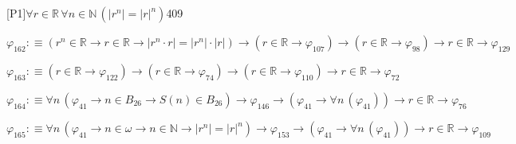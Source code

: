 \begin{fullproof}{[P1]}{$\forall r \in \mathbb{R}\,\forall n \in \mathbb{N}\,(\lvert {{r}^{n}} \rvert = {{\lvert r \rvert}^{n}})$}{409}
\begin{abbrevlist}
\item $\varphi_{162} :\equiv ({{r}^{n}} \in \mathbb{R} \to r \in \mathbb{R} \to \lvert {{r}^{n}} \cdot r \rvert = \lvert {{r}^{n}} \rvert \cdot \lvert r \rvert) \to (r \in \mathbb{R} \to \varphi_{107}) \to (r \in \mathbb{R} \to \varphi_{98}) \to r \in \mathbb{R} \to \varphi_{129}$
\item $\varphi_{163} :\equiv (r \in \mathbb{R} \to \varphi_{122}) \to (r \in \mathbb{R} \to \varphi_{74}) \to (r \in \mathbb{R} \to \varphi_{110}) \to r \in \mathbb{R} \to \varphi_{72}$
\item $\varphi_{164} :\equiv \forall n\,(\varphi_{41} \to n \in B_{26} \to S(n) \in B_{26}) \to \varphi_{146} \to (\varphi_{41} \to \forall n\,(\varphi_{41})) \to r \in \mathbb{R} \to \varphi_{76}$
\item $\varphi_{165} :\equiv \forall n\,(\varphi_{41} \to n \in \omega \to n \in \mathbb{N} \to \lvert {{r}^{n}} \rvert = {{\lvert r \rvert}^{n}}) \to \varphi_{153} \to (\varphi_{41} \to \forall n\,(\varphi_{41})) \to r \in \mathbb{R} \to \varphi_{109}$
\end{abbrevlist}
\end{fullproof}
